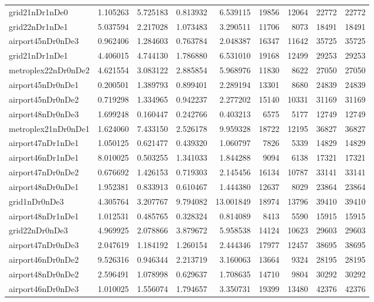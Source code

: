 \begin{longtable}{|l|r|r|r|r|r|r|r|r|}
grid21nDr1nDe0 & 1.105263 & 5.725183 & 0.813932 & 6.539115 & 19856 & 12064 & 22772 & 22772 \\
grid22nDr1nDe1 & 5.037594 & 2.217028 & 1.073483 & 3.290511 & 11706 & 8073 & 18491 & 18491 \\
airport45nDr0nDe3 & 0.962406 & 1.284603 & 0.763784 & 2.048387 & 16347 & 11642 & 35725 & 35725 \\
grid21nDr1nDe1 & 4.406015 & 4.744130 & 1.786880 & 6.531010 & 19168 & 12499 & 29253 & 29253 \\
metroplex22nDr0nDe2 & 4.621554 & 3.083122 & 2.885854 & 5.968976 & 11830 & 8622 & 27050 & 27050 \\
airport45nDr0nDe1 & 0.200501 & 1.389793 & 0.899401 & 2.289194 & 13301 & 8680 & 24839 & 24839 \\
airport45nDr0nDe2 & 0.719298 & 1.334965 & 0.942237 & 2.277202 & 15140 & 10331 & 31169 & 31169 \\
airport48nDr0nDe3 & 1.699248 & 0.160447 & 0.242766 & 0.403213 & 6575 & 5177 & 12749 & 12749 \\
metroplex21nDr0nDe1 & 1.624060 & 7.433150 & 2.526178 & 9.959328 & 18722 & 12195 & 36827 & 36827 \\
airport47nDr1nDe1 & 1.050125 & 0.621477 & 0.439320 & 1.060797 & 7826 & 5339 & 14829 & 14829 \\
airport46nDr1nDe1 & 8.010025 & 0.503255 & 1.341033 & 1.844288 & 9094 & 6138 & 17321 & 17321 \\
airport47nDr0nDe2 & 0.676692 & 1.426153 & 0.719303 & 2.145456 & 16134 & 10787 & 33141 & 33141 \\
airport48nDr0nDe1 & 1.952381 & 0.833913 & 0.610467 & 1.444380 & 12637 & 8029 & 23864 & 23864 \\
grid1nDr0nDe3 & 4.305764 & 3.207767 & 9.794082 & 13.001849 & 18974 & 13796 & 39410 & 39410 \\
airport48nDr1nDe1 & 1.012531 & 0.485765 & 0.328324 & 0.814089 & 8413 & 5590 & 15915 & 15915 \\
grid22nDr0nDe3 & 4.969925 & 2.078866 & 3.879672 & 5.958538 & 14124 & 10623 & 29603 & 29603 \\
airport47nDr0nDe3 & 2.047619 & 1.184192 & 1.260154 & 2.444346 & 17977 & 12457 & 38695 & 38695 \\
airport46nDr0nDe2 & 9.526316 & 0.946344 & 2.213719 & 3.160063 & 13664 & 9324 & 28195 & 28195 \\
airport48nDr0nDe2 & 2.596491 & 1.078998 & 0.629637 & 1.708635 & 14710 & 9804 & 30292 & 30292 \\
airport46nDr0nDe3 & 1.010025 & 1.556074 & 1.794657 & 3.350731 & 19399 & 13480 & 42376 & 42376 \\

\end{longtable}

